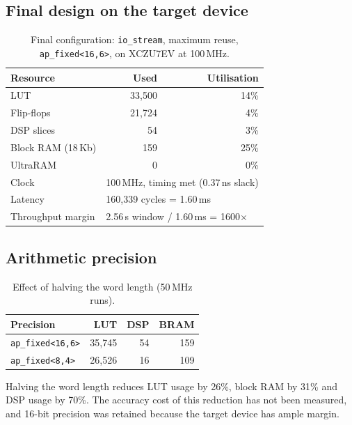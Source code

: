 \documentclass[11pt,a4paper]{article}
\begin{document}
\subsection{Final design on the target device}

\begin{table}[h]
\centering
\begin{tabular}{lrr}
\toprule
\textbf{Resource} & \textbf{Used} & \textbf{Utilisation} \\
\midrule
LUT              & 33{,}500 & 14\% \\
Flip-flops       & 21{,}724 & 4\%  \\
DSP slices       & 54       & 3\%  \\
Block RAM (18\,Kb) & 159    & 25\% \\
UltraRAM         & 0        & 0\%  \\
\midrule
Clock            & \multicolumn{2}{l}{100\,MHz, timing met (0.37\,ns slack)} \\
Latency          & \multicolumn{2}{l}{160{,}339 cycles = 1.60\,ms} \\
Throughput margin& \multicolumn{2}{l}{2.56\,s window / 1.60\,ms = 1600$\times$} \\
\bottomrule
\end{tabular}
\caption{Final configuration: \texttt{io\_stream}, maximum reuse,
\texttt{ap\_fixed<16,6>}, on XCZU7EV at 100\,MHz.}
\end{table}

\subsection{Arithmetic precision}

\begin{table}[h]
\centering
\begin{tabular}{lrrr}
\toprule
\textbf{Precision} & \textbf{LUT} & \textbf{DSP} & \textbf{BRAM} \\
\midrule
\texttt{ap\_fixed<16,6>} & 35{,}745 & 54 & 159 \\
\texttt{ap\_fixed<8,4>}  & 26{,}526 & 16 & 109 \\
\bottomrule
\end{tabular}
\caption{Effect of halving the word length (50\,MHz runs).}
\end{table}

Halving the word length reduces LUT usage by 26\%, block RAM by 31\% and DSP
usage by 70\%. The accuracy cost of this reduction has not been measured, and
16-bit precision was retained because the target device has ample margin.
\end{document}
